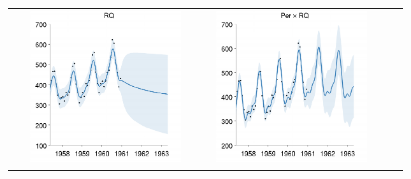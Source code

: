 \documentclass[twoside]{article}
\begin{document}
\begin{figure}[h!]
\centering
\newcommand{\wag}{4.8cm}  %
\newcommand{\hag}{4cm}  %
\begin{tabular}{cc}
\includegraphics[width=\wag,height=\hag]{../figures/decomposition/01-airline-s_max_level_0/01-airline-s_all_small}
\hspace{-1cm} \includegraphics[width=\wag,height=\hag]{../figures/decomposition/01-airline-s_max_level_1/01-airline-s_all_small} \\

\end{tabular}
\end{figure}
\end{document}
